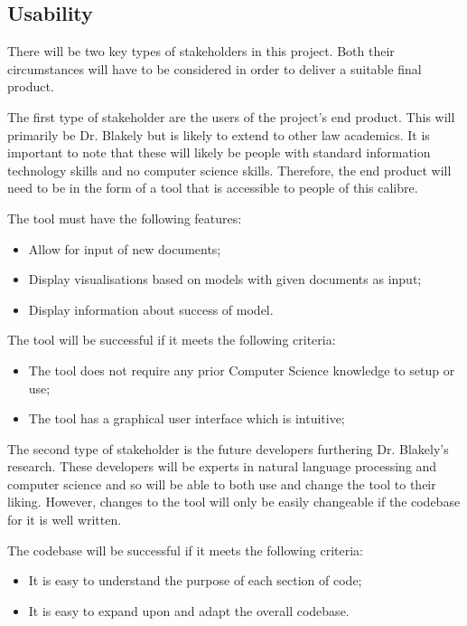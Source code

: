 		\subsection{Usability}
			There will be two key types of stakeholders in this project. Both their circumstances will have to be considered in order to deliver a suitable final product. 

			The first type of stakeholder are the users of the project’s end product. This will primarily be Dr. Blakely but is likely to extend to other law academics. It is important to note that these will likely be people with standard information technology skills and no computer science skills. Therefore, the end product will need to be in the form of a tool that is accessible to people of this calibre.  

			The tool must have the following features: 
			\begin{itemize}
				\item Allow for input of new documents;
				\item Display visualisations based on models with given documents as input;
				\item Display information about success of model.
			\end{itemize}

			The tool will be successful if it meets the following criteria: 
			\begin{itemize}
				\item The tool does not require any prior Computer Science knowledge to setup or use;
				\item The tool has a graphical user interface which is intuitive; 
			\end{itemize}
			
			The second type of stakeholder is the future developers furthering Dr. Blakely's research. These developers will be experts in natural language processing and computer science and so will be able to both use and change the tool to their liking. However, changes to the tool will only be easily changeable if the codebase for it is well written. 

			The codebase will be successful if it meets the following criteria:
			\begin{itemize}
				\item It is easy to understand the purpose of each section of code;
				\item It is easy to expand upon and adapt the overall codebase.
			\end{itemize}

